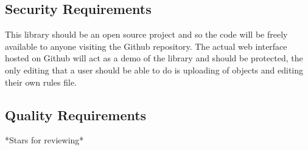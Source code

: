 \documentclass[english]{article}
\begin{document}
		\subsection{Security Requirements}
		This library should be an open source project and so the code will be freely available to anyone visiting the Github repository. The actual web interface hosted on Github will act as a demo of the library and should be protected, the only editing that a user should be able to do is uploading of objects and editing their own rules file.
		
		\subsection{Quality Requirements}
		*Stars for reviewing*
		
	\pagebreak
	
\end{document}
